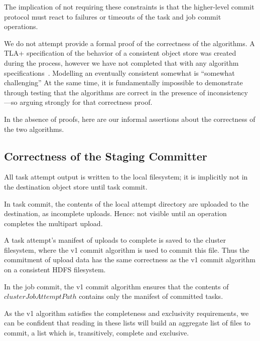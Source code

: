 \documentclass[conference]{IEEEtran}
\begin{document}
The implication of not requiring these constraints is that the higher-level
commit protocol must react to failures or timeouts of the task and job
commit operations.



We do not attempt provide a formal proof of the correctness of the algorithms.
A TLA+ specification of the behavior of a consistent object store was created
during the process, however we have not completed that with any
algorithm specifications\ \cite{s3-tla}.
Modelling an eventually consistent somewhat is ``somewhat challenging''
At the same time, it is fundamentally impossible to demonstrate through testing
that the algorithms are correct in the presence of inconsistency ---so arguing
strongly for that correctness proof.

In the absence of proofs,
here are our informal assertions about the correctness of the two algorithms.

\subsection{Correctness of the Staging Committer}

All task attempt output is written to the local filesystem;
it is implicitly not in the destination object store until task commit.

In task commit, the contents of the local attempt directory are uploaded to the
destination, as incomplete uploads.
Hence: not visible until an operation completes the multipart upload.

A task attempt's manifest of uploads to complete is saved to the cluster filesystem,
where the v1 commit algorithm is used to commit this file.
Thus the commitment of upload data has the same correctness as the
v1 commit algorithm on a consistent HDFS filesystem.

In the job commit, the v1 commit algorithm ensures that the contents
of $clusterJobAttemptPath$ contains only the manifest of committed tasks.

As the v1 algorithm satisfies the completeness and exclusivity requirements,
we can be confident that reading in these lists will build an aggregate list
of files to commit, a list which is, transitively, complete and exclusive.
\end{document}
